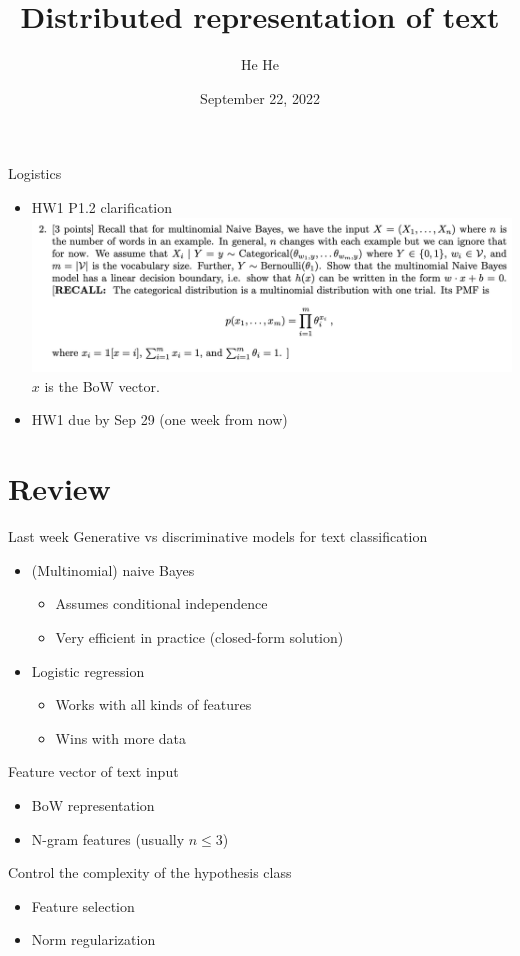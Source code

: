 \documentclass[usenames,dvipsnames,notes,11pt,aspectratio=169]{beamer}
\title[CSCI-GA.2590]{Distributed representation of text}
\author[He He]{He He
}
\institute[NYU]{New York University}
\date{September 22, 2022}
\begin{document}
\begin{frame}
\titlepage
\end{frame}

\begin{frame}
    {Logistics}
    \begin{itemize}
        \item HW1 P1.2 clarification
            \includegraphics[width=\textwidth]{figures/hw.png}\\
            $x$ is the BoW vector.
        \item HW1 due by Sep 29 (one week from now)
    \end{itemize}
\end{frame}

\section{Review}
\begin{frame}
    {Last week}
    Generative vs discriminative models for text classification\\
    \begin{itemize}
        \item (Multinomial) naive Bayes
            \begin{itemize}
                \item Assumes conditional independence
                \item Very efficient in practice (closed-form solution)
            \end{itemize}
        \item Logistic regression
            \begin{itemize}
                \item Works with all kinds of features
                \item Wins with more data
            \end{itemize}
    \end{itemize}

    Feature vector of text input\\
    \begin{itemize}
        \item BoW representation
        \item N-gram features (usually $n\le 3$)
    \end{itemize}

    Control the complexity of the hypothesis class\\
    \begin{itemize}
        \item Feature selection
        \item Norm regularization
    \end{itemize}
\end{frame}
\end{document}
